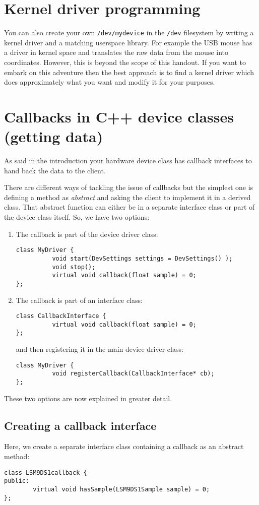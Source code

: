 \documentclass[12pt]{report}
\begin{document}
\section{Kernel driver programming}
You can also create your own \texttt{/dev/mydevice} in the \texttt{/dev} filesystem
by writing a kernel driver and a matching userspace library. For
example the USB mouse has a driver in kernel space and translates
the raw data from the mouse into coordinates. However,
this is beyond the scope of this handout. If you want to embark
on this adventure then the best approach is to
find a kernel driver which does approximately what you want and
modify it for your purposes.


\section{Callbacks in C++ device classes (getting data)}
As said in the introduction your hardware device class has callback interfaces
to hand back the data to the client.

There are different ways of tackling the issue of callbacks but the
simplest one is defining a method as \textsl{abstract} and asking the
client to implement it in a derived class. That abstract function can
either be in a separate interface class or part of the device class
itself. So, we have two options:
\begin{enumerate}
\item The callback is part of the device driver class:
\begin{verbatim}
class MyDriver {
          void start(DevSettings settings = DevSettings() );
          void stop();
          virtual void callback(float sample) = 0;
};
\end{verbatim}
\item The callback is part of an interface class:
\begin{verbatim}
class CallbackInterface {
          virtual void callback(float sample) = 0;
};
\end{verbatim}
and then registering it in the main device driver class:
\begin{verbatim}
class MyDriver {
          void registerCallback(CallbackInterface* cb);
};
\end{verbatim}
\end{enumerate}
These two options are now explained in greater detail.


\subsection{Creating a callback interface}
Here, we create a separate interface class containing a callback
as an abstract method:
\begin{verbatim}
class LSM9DS1callback {
public:
        virtual void hasSample(LSM9DS1Sample sample) = 0;
};
\end{verbatim}
\end{document}
